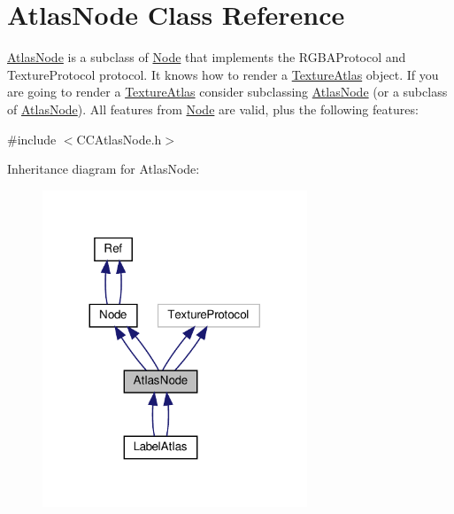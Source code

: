 \hypertarget{classAtlasNode}{}\section{Atlas\+Node Class Reference}
\label{classAtlasNode}


\hyperlink{classAtlasNode}{Atlas\+Node} is a subclass of \hyperlink{classNode}{Node} that implements the R\+G\+B\+A\+Protocol and Texture\+Protocol protocol. It knows how to render a \hyperlink{classTextureAtlas}{Texture\+Atlas} object. If you are going to render a \hyperlink{classTextureAtlas}{Texture\+Atlas} consider subclassing \hyperlink{classAtlasNode}{Atlas\+Node} (or a subclass of \hyperlink{classAtlasNode}{Atlas\+Node}). All features from \hyperlink{classNode}{Node} are valid, plus the following features\+:  




{\ttfamily \#include $<$C\+C\+Atlas\+Node.\+h$>$}



Inheritance diagram for Atlas\+Node\+:
\nopagebreak
\begin{figure}[H]
\begin{center}
\leavevmode
\includegraphics[width=224pt]{classAtlasNode__inherit__graph}
\end{center}
\end{figure}


